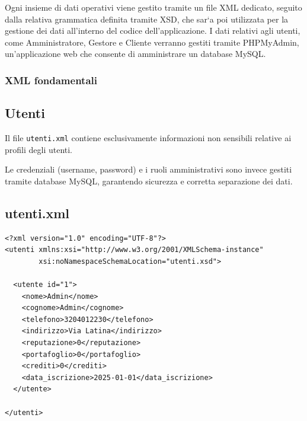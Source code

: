 \documentclass[a4paper,12pt]{report}
\begin{document}
Ogni insieme di dati operativi viene gestito tramite un file XML dedicato, seguito dalla relativa grammatica definita tramite XSD, che sar`a poi utilizzata per la gestione dei dati
all’interno del codice dell’applicazione. I dati relativi agli utenti, come Amministratore, Gestore e Cliente verranno  gestiti tramite PHPMyAdmin, un'applicazione web che consente di amministrare un database MySQL.


\subsubsection{XML fondamentali}
\subsection*{Utenti}

Il file \texttt{utenti.xml} contiene esclusivamente informazioni non sensibili
relative ai profili degli utenti.

Le credenziali (username, password) e i ruoli amministrativi sono invece gestiti
tramite database MySQL, garantendo sicurezza e corretta separazione dei dati.

\subsection*{utenti.xml}
{\footnotesize
\begin{lstlisting}
<?xml version="1.0" encoding="UTF-8"?>
<utenti xmlns:xsi="http://www.w3.org/2001/XMLSchema-instance"
        xsi:noNamespaceSchemaLocation="utenti.xsd">

  <utente id="1">
    <nome>Admin</nome>
    <cognome>Admin</cognome>
    <telefono>3204012230</telefono>
    <indirizzo>Via Latina</indirizzo>
    <reputazione>0</reputazione>
    <portafoglio>0</portafoglio>
    <crediti>0</crediti>
    <data_iscrizione>2025-01-01</data_iscrizione>
  </utente>

</utenti>
\end{lstlisting}}
\end{document}
